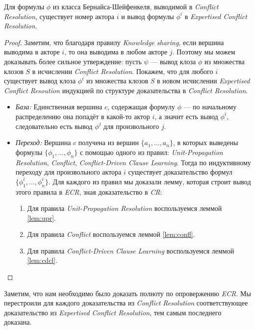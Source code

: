 \begin{theorem}
\label{thm:completeness-bs}
Для формулы $\phi$ из класса Бернайса-Шейфенкеля, выводимой в \emph{Conflict Resolution}, существует номер актора $i$ и вывод формулы $\phi^i$ в \emph{Expertised Conflict Resolution}.
\end{theorem}
\begin{proof}
Заметим, что благодаря правилу \emph{Knowledge sharing}, если вершина выводима в акторе $i$, то она выводима в любом акторе $j$. Поэтому мы можем доказывать более сильное утверждение:
пусть $\psi$ --- вывод клоза $\phi$ из множества клозов $S$ в исчислении \emph{Conflict Resolution}. Покажем, что для любого $i$ существует вывод клоза $\phi^i$ из множества клозов $S$ в новом исчислении \emph{Expertised Conflict Resoution} индукцией по структуре доказательства в \emph{Conflict Resolution}.

\begin{itemize}[label=$\star$] 
\item \emph{База:} Единственная вершина $c$, содержащая формулу $\phi$ --- по начальному распределению она попадёт в какой-то актор $i$, а значит есть вывод $\phi^i$, следовательно есть вывод $\phi^j$ для произвольного $j$.
\item \emph{Переход:} Вершина $c$ получена из вершин $\{a_1, \ldots, a_n\}$, в которых выведены формулы $\{\phi_1, \ldots, \phi_n\}$ с помощью одного из правил: \emph{Unit-Propagation Resolution}, \emph{Conflict}, \emph{Conflict-Driven Clause Learning}. Тогда по индуктивному переходу для произвольного актора $i$ существует доказательство формул $\{\phi_1^i, \ldots, \phi_n^i\}$. Для каждого из правил мы доказали лемму, которая строит вывод этого правила в \emph{ECR}, зная доказательство в \emph{CR}: 
\begin{enumerate}
	\item Для правила \emph{Unit-Propagation Resolution} воспользуемся леммой \ref{lem:upr}.
    \item Для правила \emph{Conflict} воспользуемся леммой \ref{lem:confl}.
    \item Для правила \emph{Conflict-Driven Clause Learning} воспользуемся леммой \ref{lem:cdcl}.
\end{enumerate}
\end{itemize}
\end{proof}

Заметим, что нам необходимо было доказать полноту по опровержению \emph{ECR}. Мы перестроили для каждого доказательства из \emph{Conflict Resolution} соответствующее доказательство из \emph{Expertised Conflict Resolution}, тем самым последнего доказана.




